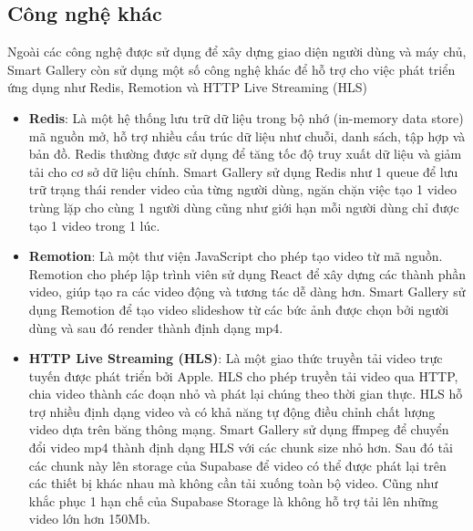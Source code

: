 \subsection{Công nghệ khác}

Ngoài các công nghệ được sử dụng để xây dựng giao diện người dùng và máy chủ, Smart Gallery còn sử dụng một số công nghệ khác để hỗ trợ cho việc phát triển ứng dụng như Redis, Remotion và HTTP Live Streaming (HLS)
\begin{itemize}
    \item \textbf{Redis}\cite{redisdoc}: Là một hệ thống lưu trữ dữ liệu trong bộ nhớ (in-memory data store) mã nguồn mở, hỗ trợ nhiều cấu trúc dữ liệu như chuỗi, danh sách, tập hợp và bản đồ. Redis thường được sử dụng để tăng tốc độ truy xuất dữ liệu và giảm tải cho cơ sở dữ liệu chính. Smart Gallery sử dụng Redis như 1 queue để lưu trữ trạng thái render video của từng người dùng, ngăn chặn việc tạo 1 video trùng lặp cho cùng 1 người dùng cũng như giới hạn mỗi người dùng chỉ được tạo 1 video trong 1 lúc.
    \item \textbf{Remotion}\cite{remotion}: Là một thư viện JavaScript cho phép tạo video từ mã nguồn. Remotion cho phép lập trình viên sử dụng React để xây dựng các thành phần video, giúp tạo ra các video động và tương tác dễ dàng hơn. Smart Gallery sử dụng Remotion để tạo video slideshow từ các bức ảnh được chọn bởi người dùng và sau đó render thành định dạng mp4. 
    \item \textbf{HTTP Live Streaming (HLS)}\cite{hls}: Là một giao thức truyền tải video trực tuyến được phát triển bởi Apple. HLS cho phép truyền tải video qua HTTP, chia video thành các đoạn nhỏ và phát lại chúng theo thời gian thực. HLS hỗ trợ nhiều định dạng video và có khả năng tự động điều chỉnh chất lượng video dựa trên băng thông mạng. Smart Gallery sử dụng ffmpeg\cite{ffmpeg} để chuyển đổi video mp4 thành định dạng HLS với các chunk size nhỏ hơn. Sau đó tải các chunk này lên storage của Supabase để video có thể được phát lại trên các thiết bị khác nhau mà không cần tải xuống toàn bộ video. Cũng như khắc phục 1 hạn chế của Supabase Storage là không hỗ trợ tải lên những video lớn hơn 150Mb. 
\end{itemize}